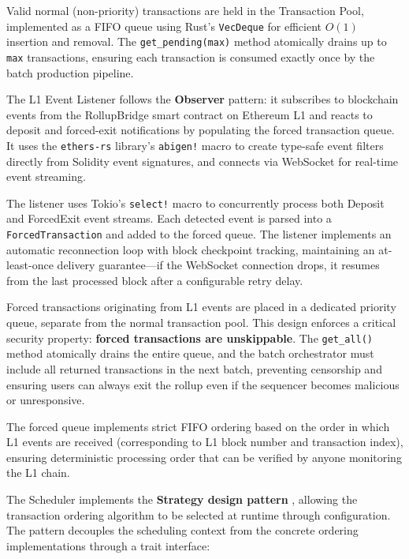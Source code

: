 Valid normal (non-priority) transactions are held in the Transaction Pool, implemented as a FIFO queue using Rust's \texttt{VecDeque} for efficient $O(1)$ insertion and removal. The \texttt{get\_pending(max)} method atomically drains up to \texttt{max} transactions, ensuring each transaction is consumed exactly once by the batch production pipeline.


The L1 Event Listener follows the \textbf{Observer} pattern: it subscribes to blockchain events from the RollupBridge smart contract on Ethereum L1 and reacts to deposit and forced-exit notifications by populating the forced transaction queue. It uses the \texttt{ethers-rs} library's \texttt{abigen!} macro to create type-safe event filters directly from Solidity event signatures, and connects via WebSocket for real-time event streaming.

The listener uses Tokio's \texttt{select!} macro to concurrently process both Deposit and ForcedExit event streams. Each detected event is parsed into a \texttt{ForcedTransaction} and added to the forced queue. The listener implements an automatic reconnection loop with block checkpoint tracking, maintaining an at-least-once delivery guarantee---if the WebSocket connection drops, it resumes from the last processed block after a configurable retry delay.


Forced transactions originating from L1 events are placed in a dedicated priority queue, separate from the normal transaction pool. This design enforces a critical security property: \textbf{forced transactions are unskippable}. The \texttt{get\_all()} method atomically drains the entire queue, and the batch orchestrator must include all returned transactions in the next batch, preventing censorship and ensuring users can always exit the rollup even if the sequencer becomes malicious or unresponsive.

The forced queue implements strict FIFO ordering based on the order in which L1 events are received (corresponding to L1 block number and transaction index), ensuring deterministic processing order that can be verified by anyone monitoring the L1 chain.

\label{sec:scheduler}

The Scheduler implements the \textbf{Strategy design pattern} \cite{gamma1994design}, allowing the transaction ordering algorithm to be selected at runtime through configuration. The pattern decouples the scheduling context from the concrete ordering implementations through a trait interface:

